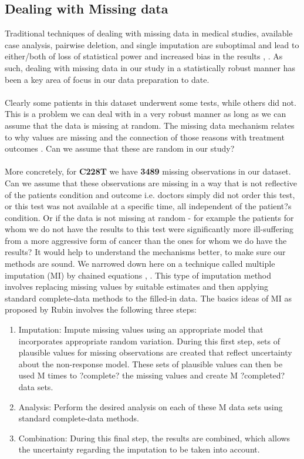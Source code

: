 \documentclass[a4paper]{article}
\begin{document}
\subsection{Dealing with Missing data}
Traditional techniques of dealing with missing data in medical studies, available case analysis, pairwise deletion, and single imputation are suboptimal and lead to either/both of loss of statistical power and increased bias in the results \cite{Bell2014}, \cite{Little2012}. As such, dealing with missing data in our study in a statistically robust manner has been a key area of focus in our data preparation to date.\\
\\
Clearly some patients in this dataset underwent some tests, while others did not. This is a problem we can deal with in a very robust manner as long as we can assume that the data is missing at random. The missing data mechanism relates to why values are missing and the connection of those reasons with treatment outcomes \cite{Garcia-Laencina2015}. Can we assume that these are random in our study? \\
\\
More concretely, for \textbf{C228T} we have \textbf{3489} missing observations in our dataset. Can we assume that these observations are missing in a way that is not reflective of the patients condition and outcome i.e. doctors simply did not order this test, or this test was not available at a specific time, all independent of the patient?s condition. Or if the data is not missing at random - for example the patients for whom we do not have the results to this test were significantly more ill-suffering from a more aggressive form of cancer than the ones for whom we do have the results? It would help to understand the mechanisms better, to make sure our methods are sound. We narrowed down here on a technique called multiple imputation (MI) by chained equations \cite{Graham2007}, \cite{Graham2009}. This type of imputation method involves replacing missing values by suitable estimates and then applying standard complete-data methods to the filled-in data. The basics ideas of MI as proposed by Rubin \cite{Rubin1996} involves the following three steps: 
\begin{enumerate}
\item Imputation: Impute missing values using an appropriate model that incorporates appropriate random variation. During this first step, sets of plausible values for missing observations are created that reflect uncertainty about the non-response model. These sets of plausible values can then be used M times to ?complete? the missing values and create M ?completed? data sets. 
\item Analysis: Perform the desired analysis on each of these M data sets using standard complete-data methods. 
\item Combination: During this final step, the results are combined, which allows the uncertainty regarding the imputation to be taken into account.
\end{enumerate}
\end{document}
